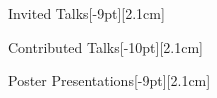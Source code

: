 \documentclass{cv} %
\begin{document}
%     

\begin{cvSection}{Invited Talks}[-9pt][2.1cm]
    
\end{cvSection}

\begin{cvSection}{Contributed Talks}[-10pt][2.1cm]
    
\end{cvSection}

\begin{cvSection}{Poster Presentations}[-9pt][2.1cm]
    
\end{cvSection}
\end{document}
